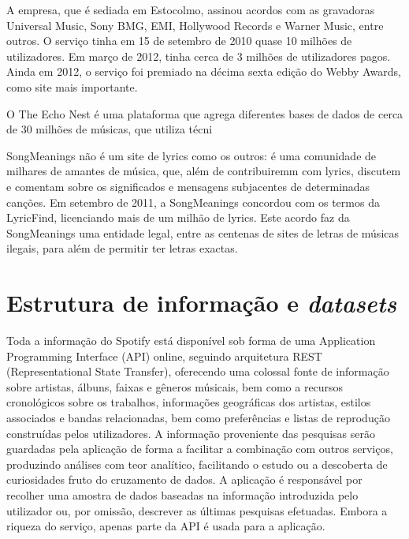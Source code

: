 \documentclass[twocolumn,twoside,11pt,a4paper]{article}
\begin{document}
A empresa, que é sediada em Estocolmo, assinou acordos com as gravadoras Universal Music,
Sony BMG, EMI, Hollywood Records e Warner Music, entre outros. O serviço tinha em 15 de
setembro de 2010 quase 10 milhões de utilizadores. Em março de 2012, tinha cerca de 3 milhões
de utilizadores pagos. Ainda em 2012, o serviço foi premiado na décima sexta edição do Webby
Awards, como site mais importante.

O The Echo Nest é uma plataforma que agrega diferentes bases de dados de cerca de 30 milhões
de músicas, que utiliza técni

SongMeanings não é um site de lyrics como os outros: é uma comunidade de milhares de amantes
de música, que, além de contribuiremm com lyrics, discutem e comentam sobre os significados
e mensagens subjacentes de determinadas canções.
Em setembro de 2011, a SongMeanings concordou com os termos da LyricFind, licenciando mais
de um milhão de lyrics. Este acordo faz da SongMeanings uma entidade legal, entre as centenas
de sites de letras de músicas ilegais, para além de permitir ter letras exactas.



\section{Estrutura de informação e \textit{datasets}}\label{sec:structure}

Toda a informação do Spotify está disponível sob forma de uma Application Programming Interface
(API) online, seguindo arquitetura REST (Representational State Transfer), oferecendo uma
colossal fonte de informação sobre artistas, álbuns, faixas e gêneros músicais, bem como a
recursos cronológicos sobre os trabalhos, informações geográficas dos artistas, estilos
associados e bandas relacionadas, bem como preferências e listas de reprodução construídas
pelos utilizadores.
A informação proveniente das pesquisas serão guardadas pela aplicação de forma a facilitar
a combinação com outros serviços, produzindo análises com teor analítico, facilitando o
estudo ou a descoberta de curiosidades fruto do cruzamento de dados.
A aplicação é responsável por recolher uma amostra de dados baseadas na informação introduzida
pelo utilizador ou, por omissão, descrever as últimas pesquisas efetuadas.
Embora a riqueza do serviço, apenas parte da API é usada para a aplicação.

\end{document}
